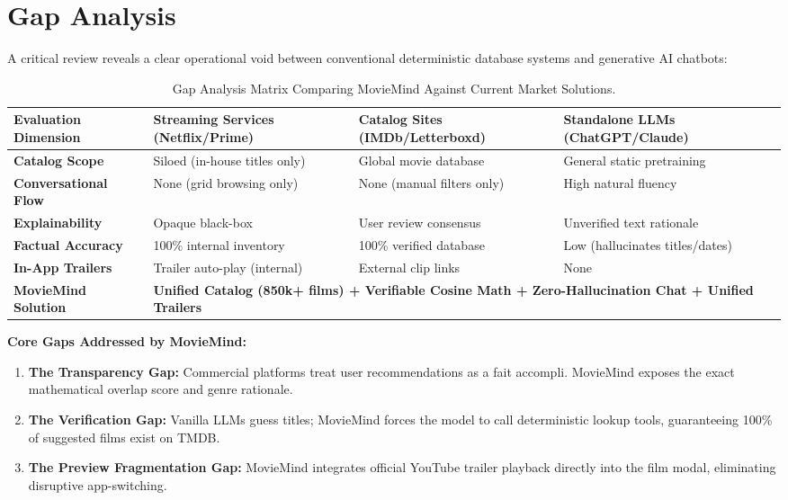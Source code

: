 \documentclass[11pt,a4paper]{article}
\begin{document}
\clearpage
\section{Gap Analysis}

A critical review reveals a clear operational void between conventional deterministic database systems and generative AI chatbots:

\begin{table}[H]
\centering
\small
\begin{tabularx}{\textwidth}{p{3.2cm} X X X}
\toprule
\rowcolor{tableheader}
\textbf{Evaluation Dimension} & \textbf{Streaming Services (Netflix/Prime)} & \textbf{Catalog Sites (IMDb/Letterboxd)} & \textbf{Standalone LLMs (ChatGPT/Claude)} \\
\midrule
\textbf{Catalog Scope} & Siloed (in-house titles only) & Global movie database & General static pretraining \\
\textbf{Conversational Flow} & None (grid browsing only) & None (manual filters only) & High natural fluency \\
\textbf{Explainability} & Opaque black-box & User review consensus & Unverified text rationale \\
\textbf{Factual Accuracy} & 100\% internal inventory & 100\% verified database & Low (hallucinates titles/dates) \\
\textbf{In-App Trailers} & Trailer auto-play (internal) & External clip links & None \\
\midrule
\rowcolor{lightgrey}
\textbf{MovieMind Solution} & \multicolumn{3}{l}{\textbf{Unified Catalog (850k+ films) + Verifiable Cosine Math + Zero-Hallucination Chat + Unified Trailers}} \\
\bottomrule
\end{tabularx}
\caption{Gap Analysis Matrix Comparing MovieMind Against Current Market Solutions.}
\label{tab:gap}
\end{table}

\textbf{Core Gaps Addressed by MovieMind:}
\begin{enumerate}[leftmargin=*]
    \item \textbf{The Transparency Gap:} Commercial platforms treat user recommendations as a fait accompli. MovieMind exposes the exact mathematical overlap score and genre rationale.
    \item \textbf{The Verification Gap:} Vanilla LLMs guess titles; MovieMind forces the model to call deterministic lookup tools, guaranteeing 100\% of suggested films exist on TMDB.
    \item \textbf{The Preview Fragmentation Gap:} MovieMind integrates official YouTube trailer playback directly into the film modal, eliminating disruptive app-switching.
\end{enumerate}
\end{document}
